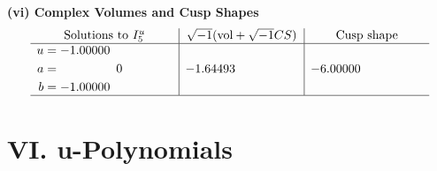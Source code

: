 \documentclass[1p]{elsarticle_modified}
\theoremstyle{definition}
\newcommand{\I}{\sqrt{-1}}
\begin{document}
\newpage\flushleft \textbf{(vi) Complex Volumes and Cusp Shapes}
$$\begin{array}{c|c|c}  
\text{Solutions to }I^u_{5}& \I (\text{vol} + \sqrt{-1}CS) & \text{Cusp shape}\\
 \hline 
\begin{aligned}
u &= -1.00000\phantom{ +0.000000I} \\
a &= \phantom{-0.000000 } 0 \\
b &= -1.00000\phantom{ +0.000000I}\end{aligned}
 & -1.64493\phantom{ +0.000000I} & -6.00000\phantom{ +0.000000I}\\
 \hline 
 \end{array}$$\newpage
\newpage\renewcommand{\arraystretch}{1}
\centering \section*{ VI. u-Polynomials}
\end{document}
